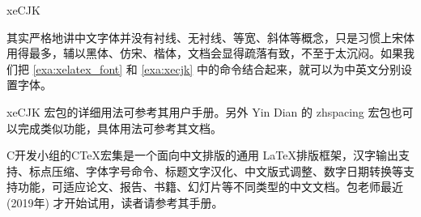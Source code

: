 \begin{example}[h]
\begin{Code}[numbers=left]
\usepackage[CJKchecksingle,CJKnumber]{xeCJK}
\end{Code}
\caption{xeCJK}
\label{exa:xecjk}
\end{example}

其实严格地讲中文字体并没有衬线、无衬线、等宽、斜体等概念，只是习惯上宋体用得最多，辅以黑体、仿宋、楷体，文档会显得疏落有致，不至于太沉闷。如果我们把 \autoref{exa:xelatex_font} 和 \autoref{exa:xecjk} 中的命令结合起来，就可以为中英文分别设置字体。

xeCJK 宏包的详细用法可参考其用户手册\citep{Sun_xecjk}。另外 Yin Dian 的 zhspacing 宏包也可以完成类似功能，具体用法可参考其文档\citep{Yin_zhspacing}。

C\Tex 开发小组的C\TeX 宏集是一个面向中文排版的通用 \LaTeX 排版框架，汉字输出支持、标点压缩、字体字号命令、标题文字汉化、中文版式调整、数字日期转换等支持功能，可适应论文、报告、书籍、幻灯片等不同类型的中文文档。包老师最近 (2019年) 才开始试用，读者请参考其手册\citep{CTeX_ctex}。



